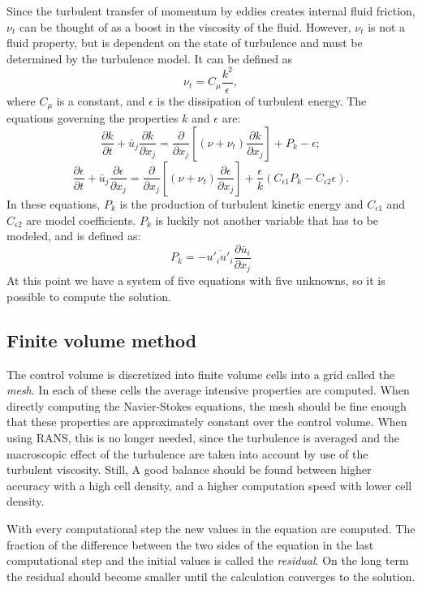 Since the turbulent transfer of momentum by eddies creates internal fluid friction, $\nu_t$ can be thought of as a boost in the viscosity of the fluid. However, $\nu_t$ is not a fluid property, but is dependent on the state of turbulence and must be determined by the turbulence model. It can be defined as 
\begin{equation}\label{eq:NU}
\nu_t = C_\mu\frac{k^2}{\epsilon},
\end{equation}
where $C_\mu$ is a constant, and $\epsilon$ is the dissipation of turbulent energy. The equations governing the properties $k$ and $\epsilon$ are:
\begin{equation}\label{eq:ke1}
\frac{\partial k}{\partial t} + \bar{u}_j\frac{\partial k}{\partial x_j} = \frac{\partial}{\partial x_j} \left[(\nu + \nu_t) \frac{\partial k }{\partial x_j}\right] + P_k - \epsilon;
\end{equation}
\begin{equation}\label{eq:ke2}
\frac{\partial \epsilon}{\partial t} + \bar{u}_j\frac{\partial \epsilon}{\partial x_j} = \frac{\partial}{\partial x_j} \left[(\nu + \nu_t) \frac{\partial \epsilon}{\partial x_j}\right] + \frac{\epsilon}{k}(C_{\epsilon 1}P_k - C_{\epsilon 2}\epsilon).
\end{equation}
In these equations, $P_k$ is the production of turbulent kinetic energy and $C_{\epsilon 1}$ and $C_{\epsilon 2}$ are model coefficients. $P_k$ is luckily not another variable that has to be modeled, and is defined as:
\begin{equation}\label{eq:P}
P_k=-\overline{u'_iu'_i}\frac{\partial \bar{u}_i}{\partial x_j}
\end{equation}
At this point we have a system of five equations with five unknowns, so it is possible to compute the solution.

\subsection{Finite volume method}

The control volume is discretized into finite volume cells into a grid called the \emph{mesh}. In each of these cells the average intensive properties are computed. When directly computing the Navier-Stokes equations, the mesh should be fine enough that these properties are approximately constant over the control volume. When using RANS, this is no longer needed, since the turbulence is averaged and the macroscopic effect of the turbulence are taken into account by use of the turbulent viscosity. Still, A good balance should be found between higher accuracy with a high cell density, and a higher computation speed with lower cell density. 

With every computational step the new values in the equation are computed. The fraction of the difference between the two sides of the equation in the last computational step and the initial values is called the \emph{residual}. On the long term the residual should become smaller until the calculation converges to the solution. 